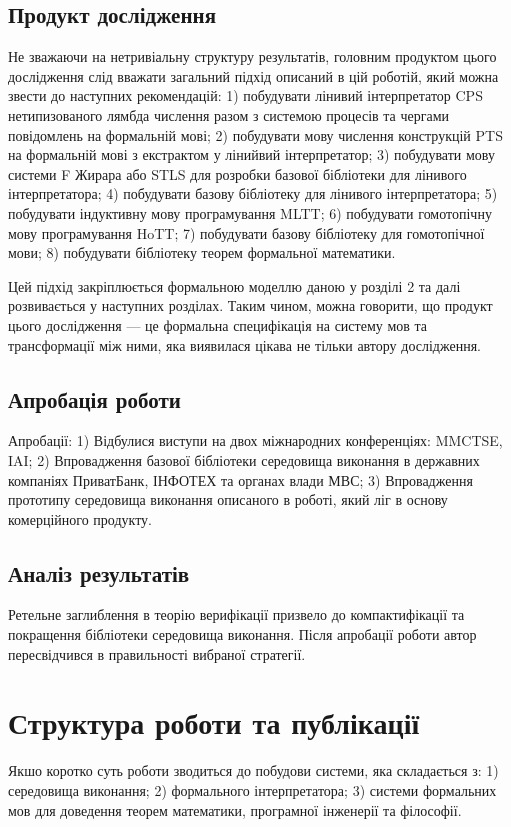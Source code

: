 \subsection{Продукт дослідження}
Не зважаючи на нетривіальну структуру результатів, головним продуктом цього
дослідження слід вважати загальний підхід описаний в цій роботій, який можна
звести до наступних рекомендацій:
1) побудувати лінивий інтерпретатор CPS нетипизованого лямбда числення разом
   з системою процесів та чергами повідомлень на формальній мові;
2) побудувати мову числення конструкцій PTS на формальній мові з екстрактом у лінийвий інтерпретатор;
3) побудувати мову системи F Жирара або STLS для розробки базової бібліотеки для лінивого інтерпретатора;
4) побудувати базову бібліотеку для лінивого інтерпретатора;
5) побудувати індуктивну мову програмування MLTT;
6) побудувати гомотопічну мову програмування HoTT;
7) побудувати базову бібліотеку для гомотопічної мови;
8) побудувати бібліотеку теорем формальної математики.

Цей підхід закріплюється формальною моделлю даною у розділі 2 та далі розвивається у наступних розділах.
Таким чином, можна говорити, що продукт цього дослідження --- це формальна специфікація на систему мов та
трансформації між ними, яка виявилася цікава не тільки автору дослідження.

\subsection{Апробація роботи}
Апробації:
1) Відбулися виступи на двох міжнародних конференціях: MMCTSE, IAI;
2) Впровадження базової бібліотеки середовища виконання в державних компаніях ПриватБанк,
   ІНФОТЕХ та органах влади МВС;
3) Впровадження прототипу середовища виконання описаного в роботі,
   який ліг в основу комерційного продукту.

\subsection{Аналіз результатів}
Ретельне заглиблення в теорію верифікації призвело до компактифікації
та покращення бібліотеки середовища виконання. Після апробації роботи
автор пересвідчився в правильності вибраної стратегії.

\newpage
\section{Структура роботи та публікації}
Якшо коротко суть роботи зводиться до побудови системи, яка складається з:
1) середовища виконання;
2) формального інтерпретатора;
3) системи формальних мов для доведення теорем математики, програмної інженерії та філософії.


